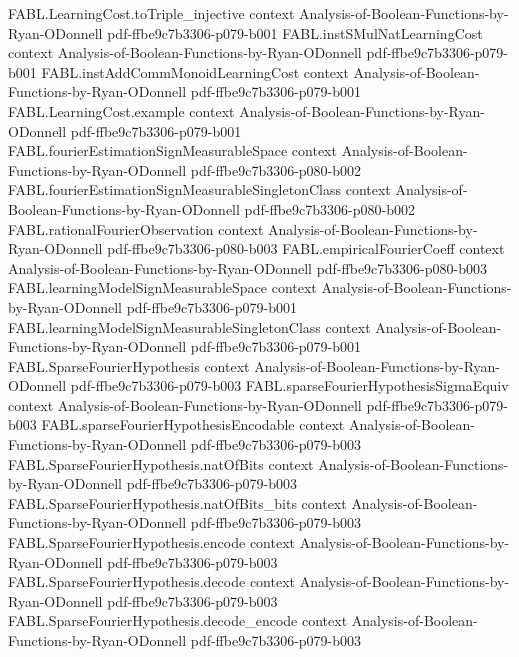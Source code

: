 \begin{theorem}
\proofstep
  {FABL.LearningCost.toTriple_injective}
  {context}
  {Analysis-of-Boolean-Functions-by-Ryan-ODonnell}
  {pdf-ffbe9c7b3306-p079-b001}
\proofstep
  {FABL.instSMulNatLearningCost}
  {context}
  {Analysis-of-Boolean-Functions-by-Ryan-ODonnell}
  {pdf-ffbe9c7b3306-p079-b001}
\proofstep
  {FABL.instAddCommMonoidLearningCost}
  {context}
  {Analysis-of-Boolean-Functions-by-Ryan-ODonnell}
  {pdf-ffbe9c7b3306-p079-b001}
\proofstep
  {FABL.LearningCost.example}
  {context}
  {Analysis-of-Boolean-Functions-by-Ryan-ODonnell}
  {pdf-ffbe9c7b3306-p079-b001}
\proofstep
  {FABL.fourierEstimationSignMeasurableSpace}
  {context}
  {Analysis-of-Boolean-Functions-by-Ryan-ODonnell}
  {pdf-ffbe9c7b3306-p080-b002}
\proofstep
  {FABL.fourierEstimationSignMeasurableSingletonClass}
  {context}
  {Analysis-of-Boolean-Functions-by-Ryan-ODonnell}
  {pdf-ffbe9c7b3306-p080-b002}
\proofstep
  {FABL.rationalFourierObservation}
  {context}
  {Analysis-of-Boolean-Functions-by-Ryan-ODonnell}
  {pdf-ffbe9c7b3306-p080-b003}
\proofstep
  {FABL.empiricalFourierCoeff}
  {context}
  {Analysis-of-Boolean-Functions-by-Ryan-ODonnell}
  {pdf-ffbe9c7b3306-p080-b003}
\proofstep
  {FABL.learningModelSignMeasurableSpace}
  {context}
  {Analysis-of-Boolean-Functions-by-Ryan-ODonnell}
  {pdf-ffbe9c7b3306-p079-b001}
\proofstep
  {FABL.learningModelSignMeasurableSingletonClass}
  {context}
  {Analysis-of-Boolean-Functions-by-Ryan-ODonnell}
  {pdf-ffbe9c7b3306-p079-b001}
\proofstep
  {FABL.SparseFourierHypothesis}
  {context}
  {Analysis-of-Boolean-Functions-by-Ryan-ODonnell}
  {pdf-ffbe9c7b3306-p079-b003}
\proofstep
  {FABL.sparseFourierHypothesisSigmaEquiv}
  {context}
  {Analysis-of-Boolean-Functions-by-Ryan-ODonnell}
  {pdf-ffbe9c7b3306-p079-b003}
\proofstep
  {FABL.sparseFourierHypothesisEncodable}
  {context}
  {Analysis-of-Boolean-Functions-by-Ryan-ODonnell}
  {pdf-ffbe9c7b3306-p079-b003}
\proofstep
  {FABL.SparseFourierHypothesis.natOfBits}
  {context}
  {Analysis-of-Boolean-Functions-by-Ryan-ODonnell}
  {pdf-ffbe9c7b3306-p079-b003}
\proofstep
  {FABL.SparseFourierHypothesis.natOfBits_bits}
  {context}
  {Analysis-of-Boolean-Functions-by-Ryan-ODonnell}
  {pdf-ffbe9c7b3306-p079-b003}
\proofstep
  {FABL.SparseFourierHypothesis.encode}
  {context}
  {Analysis-of-Boolean-Functions-by-Ryan-ODonnell}
  {pdf-ffbe9c7b3306-p079-b003}
\proofstep
  {FABL.SparseFourierHypothesis.decode}
  {context}
  {Analysis-of-Boolean-Functions-by-Ryan-ODonnell}
  {pdf-ffbe9c7b3306-p079-b003}
\proofstep
  {FABL.SparseFourierHypothesis.decode_encode}
  {context}
  {Analysis-of-Boolean-Functions-by-Ryan-ODonnell}
  {pdf-ffbe9c7b3306-p079-b003}

\end{theorem}
